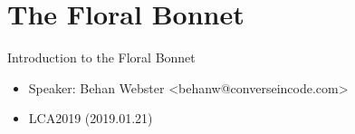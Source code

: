 \section{The Floral Bonnet}

\begin{frame}
   {Introduction to the Floral Bonnet}
   \begin{itemize}
      \item Speaker: Behan Webster \textless behanw@converseincode.com\textgreater
      \item LCA2019 (2019.01.21)
   \end{itemize}
\end{frame}

\cprotect{}

